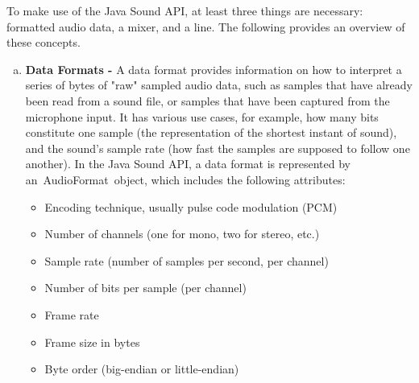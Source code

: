 To make use of the Java Sound API, at least three things are necessary: formatted audio data, a mixer, and a line. The following provides an overview of
these concepts.

\begin{enumerate}[a.] 
        \item \textbf{Data Formats -} 
                A data format provides information on how to interpret a series of bytes of "raw" sampled audio data, such as samples that have already
                been read from a sound file, or samples that have been captured from the microphone input. It has various use cases, for example, how many
                bits constitute one sample (the representation of the shortest instant of sound), and the sound's sample rate (how fast the samples are supposed to
                follow one another). In the Java Sound API, a data format is represented by an AudioFormat object, which includes the following attributes:
                \begin{itemize}
                        \item Encoding technique, usually pulse code modulation (PCM)
                        \item Number of channels (one for mono, two for stereo, etc.)
                        \item Sample rate (number of samples per second, per channel)
                        \item Number of bits per sample (per channel)
                        \item Frame rate
                        \item Frame size in bytes
                        \item Byte order (big-endian or little-endian)
                \end{itemize}


\end{enumerate}
